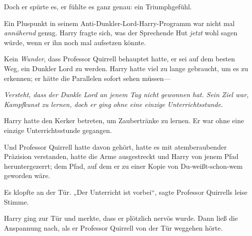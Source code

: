 Doch er spürte es, er fühlte es ganz genau: ein Triumphgefühl.

Ein Pluspunkt in seinem Anti-Dunkler-Lord-Harry-Programm war nicht mal \emph{annähernd} genug. Harry fragte sich, was der Sprechende Hut \emph{jetzt} wohl sagen würde, wenn er ihn noch mal aufsetzen könnte.

Kein \emph{Wunder}, dass Professor Quirrell behauptet hatte, er sei auf dem besten Weg, ein Dunkler Lord zu werden. Harry hatte viel zu lange gebraucht, um es zu erkennen; er hätte die Parallelen sofort sehen müssen—

\emph{Versteht, dass der Dunkle Lord an jenem Tag nicht gewonnen hat. Sein Ziel war, Kampfkunst zu lernen, doch er ging ohne eine einzige Unterrichtsstunde.}

Harry hatte den Kerker betreten, um Zaubertränke zu lernen. Er war ohne eine einzige Unterrichtsstunde gegangen.

Und Professor Quirrell hatte davon gehört, hatte es mit atemberaubender Präzision verstanden, hatte die Arme ausgestreckt und Harry von jenem Pfad heruntergezerrt; dem Pfad, auf dem er zu einer Kopie von Du-weißt-schon-wem geworden wäre.

Es klopfte an der Tür. „Der Unterricht ist vorbei“, sagte Professor Quirrells leise Stimme.

Harry ging zur Tür und merkte, dass er plötzlich nervös wurde. Dann ließ die Anspannung nach, als er Professor Quirrell von der Tür weggehen hörte.

